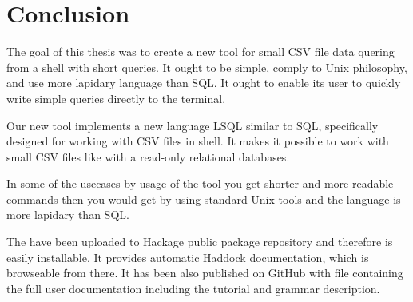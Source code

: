 \chapter*{Conclusion}

The goal of this thesis was to create a new tool for small CSV file data quering from a shell with short queries.
It ought to be simple, comply to Unix philosophy, and use more lapidary language than SQL.
It ought to enable its user to quickly write simple queries directly to the terminal.

Our new tool  implements a new language LSQL similar to
SQL, specifically designed for working with CSV files in shell. It makes it possible to work with small CSV files like with a read-only relational databases.

In some of the usecases by usage of the tool you get shorter and more readable commands then you would get by using standard Unix tools and the 
language is more lapidary than SQL.

The  have been uploaded to Hackage public package repository and therefore is easily installable. 
It provides automatic Haddock documentation, which is browseable from there. 
It has been also published on GitHub with  file containing the full user documentation including the tutorial and grammar description.

